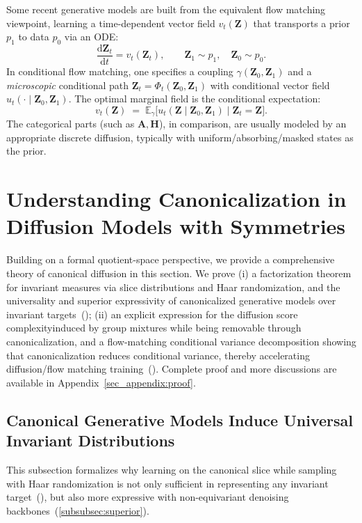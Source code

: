 \documentclass{article}
\theoremstyle{plain}
\theoremstyle{definition}
\theoremstyle{remark}
\newcommand{\E}{\mathbb{E}}
\newcommand{\1}{\mathbf{1}}
\newcommand{\Z}{\mathbf{Z}}
\newcommand{\Hc}{\mathbf{H}}
\newcommand{\A}{\mathbf{A}}
\begin{document}
Some recent generative models are built from the equivalent flow matching viewpoint, learning a time-dependent vector field $v_t(\Z)$ that transports a prior $p_1$ to data $p_0$ via an ODE:
\begin{equation}\label{eq:ode}
\frac{\mathrm{d}\Z_t}{\mathrm{d}t}=v_t(\Z_t),\qquad \Z_1\sim p_1,\quad \Z_0\sim p_0.
\end{equation}
In conditional flow matching, one specifies a coupling $\gamma(\Z_0,\Z_1)$ and a \emph{microscopic} conditional path $\Z_t=\Phi_t(\Z_0,\Z_1)$ with conditional vector field $u_t(\cdot\mid \Z_0,\Z_1)$. The optimal marginal field is the conditional expectation:
\begin{equation}\label{eq:marginal-field}
v_t(\Z)\;=\;\E_{\gamma}\big[u_t(\Z\mid \Z_0,\Z_1)\mid \Z_t=\Z\big].
\end{equation}
The categorical parts (such as $\A,\Hc$), in comparison, are usually modeled by an appropriate discrete diffusion, typically with uniform/absorbing/masked states as the prior.


\section{Understanding Canonicalization in Diffusion Models with Symmetries}\label{sec:theory}

Building on a formal quotient-space perspective, we provide a comprehensive theory of canonical diffusion in this section. We prove (i) a factorization theorem for invariant measures via slice distributions and Haar randomization, and the universality and superior expressivity of canonicalized generative models over invariant targets~(); (ii) an explicit expression for the diffusion score complexityinduced by group mixtures while being removable through canonicalization, and a flow-matching conditional variance decomposition showing that canonicalization reduces conditional variance, thereby accelerating diffusion/flow matching training~(). 
Complete proof and more discussions are available in Appendix~\ref{sec_appendix:proof}.

\subsection{Canonical Generative Models Induce Universal Invariant Distributions}\label{subsec:correct_superior}

This subsection formalizes why learning on the canonical slice while sampling with Haar randomization is not only sufficient in representing any invariant target~(), but also more expressive with non-equivariant denoising backbones~(\cref{subsubsec:superior}).
\end{document}
